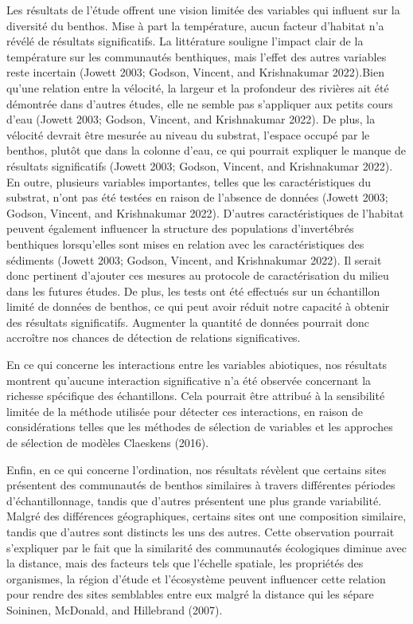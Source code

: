 \documentclass[9pt,twocolumn,twoside,]{pnas-new}
\begin{document}
Les résultats de l'étude offrent une vision limitée des variables qui
influent sur la diversité du benthos. Mise à part la température, aucun
facteur d'habitat n'a révélé de résultats significatifs. La littérature
souligne l'impact clair de la température sur les communautés
benthiques, mais l'effet des autres variables reste incertain (Jowett
2003; Godson, Vincent, and Krishnakumar 2022).Bien qu'une relation entre
la vélocité, la largeur et la profondeur des rivières ait été démontrée
dans d'autres études, elle ne semble pas s'appliquer aux petits cours
d'eau (Jowett 2003; Godson, Vincent, and Krishnakumar 2022). De plus, la
vélocité devrait être mesurée au niveau du substrat, l'espace occupé par
le benthos, plutôt que dans la colonne d'eau, ce qui pourrait expliquer
le manque de résultats significatifs (Jowett 2003; Godson, Vincent, and
Krishnakumar 2022). En outre, plusieurs variables importantes, telles
que les caractéristiques du substrat, n'ont pas été testées en raison de
l'absence de données (Jowett 2003; Godson, Vincent, and Krishnakumar
2022). D'autres caractéristiques de l'habitat peuvent également
influencer la structure des populations d'invertébrés benthiques
lorsqu'elles sont mises en relation avec les caractéristiques des
sédiments (Jowett 2003; Godson, Vincent, and Krishnakumar 2022). Il
serait donc pertinent d'ajouter ces mesures au protocole de
caractérisation du milieu dans les futures études. De plus, les tests
ont été effectués sur un échantillon limité de données de benthos, ce
qui peut avoir réduit notre capacité à obtenir des résultats
significatifs. Augmenter la quantité de données pourrait donc accroître
nos chances de détection de relations significatives.

En ce qui concerne les interactions entre les variables abiotiques, nos
résultats montrent qu'aucune interaction significative n'a été observée
concernant la richesse spécifique des échantillons. Cela pourrait être
attribué à la sensibilité limitée de la méthode utilisée pour détecter
ces interactions, en raison de considérations telles que les méthodes de
sélection de variables et les approches de sélection de modèles
Claeskens (2016).

Enfin, en ce qui concerne l'ordination, nos résultats révèlent que
certains sites présentent des communautés de benthos similaires à
travers différentes périodes d'échantillonnage, tandis que d'autres
présentent une plus grande variabilité. Malgré des différences
géographiques, certains sites ont une composition similaire, tandis que
d'autres sont distincts les uns des autres. Cette observation pourrait
s'expliquer par le fait que la similarité des communautés écologiques
diminue avec la distance, mais des facteurs tels que l'échelle spatiale,
les propriétés des organismes, la région d'étude et l'écosystème peuvent
influencer cette relation pour rendre des sites semblables entre eux
malgré la distance qui les sépare Soininen, McDonald, and Hillebrand
(2007).
\end{document}
